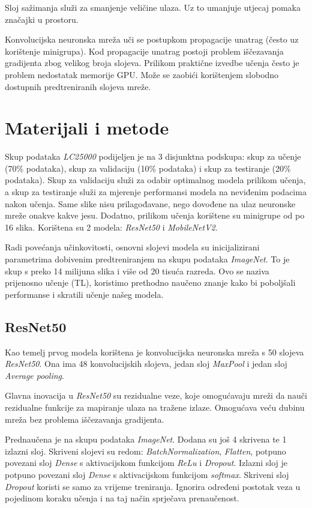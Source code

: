 \documentclass[conference, utf8]{IEEEtran}
\begin{document}
	Sloj sažimanja služi za smanjenje veličine ulaza. Uz to umanjuje utjecaj pomaka značajki u prostoru.
	
	Konvolucijska neuronska mreža uči se postupkom propagacije unatrag (često uz korištenje minigrupa). Kod propagacije unatrag postoji problem iščezavanja gradijenta zbog velikog broja slojeva. Prilikom praktične izvedbe učenja često je problem nedostatak memorije GPU. Može se zaobići korištenjem slobodno dostupnih predtreniranih slojeva mreže.
	
	\section{Materijali i metode}
	Skup podataka \textit{LC25000} podijeljen je na 3 disjunktna podskupa: skup za učenje (70\% podataka), skup za validaciju (10\% podataka) i skup za testiranje (20\% podataka). Skup za validaciju služi za odabir optimalnog modela prilikom učenja, a skup za testiranje služi za mjerenje performansi modela na neviđenim podacima nakon učenja. Same slike nisu prilagođavane, nego dovođene na ulaz neuronske mreže onakve kakve jesu. Dodatno, prilikom učenja korištene su minigrupe od po 16 slika. Korištena su 2 modela: \textit{ResNet50} i \textit{MobileNetV2}. 
	
	Radi povećanja učinkovitosti, osnovni slojevi modela su inicijalizirani parametrima dobivenim predtreniranjem na skupu podataka \textit{ImageNet}. To je skup s preko 14 milijuna slika i više od 20 tisuća razreda. Ovo se naziva prijenosno učenje (TL), koristimo prethodno naučeno znanje kako bi poboljšali performanse i skratili učenje našeg modela.
	
	\subsection{ResNet50}
	Kao temelj prvog modela korištena je konvolucijska neuronska mreža s 50 slojeva \textit{ResNet50}. Ona ima 48 konvolucijskih slojeva, jedan sloj \textit{MaxPool} i jedan sloj \textit{Average pooling}. 
	
	Glavna inovacija u \textit{ResNet50} su rezidualne veze, koje omogućavaju mreži da nauči rezidualne funkcije za mapiranje ulaza na tražene izlaze. Omogućava veću dubinu mreža bez problema iščezavanja gradijenta. 
	
	Prednaučena je na skupu podataka \textit{ImageNet}. Dodana su još 4 skrivena te 1 izlazni sloj. Skriveni slojevi su redom: \textit{BatchNormalization}, \textit{Flatten}, potpuno povezani sloj \textit{Dense} s aktivacijskom funkcijom \textit{ReLu} i \textit{Dropout}. Izlazni sloj je potpuno povezani sloj \textit{Dense} s aktivacijskom funkcijom \textit{softmax}. Skriveni sloj \textit{Dropout} koristi se samo za vrijeme treniranja. Ignorira određeni postotak veza u pojedinom koraku učenja i na taj način sprječava prenaučenost.
\end{document}
